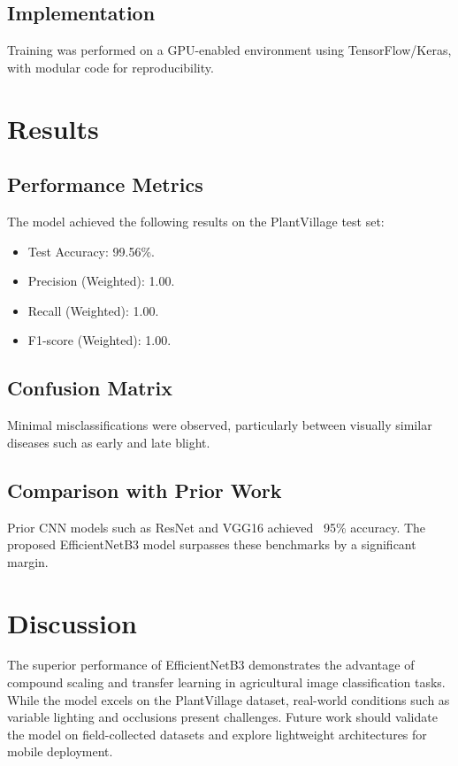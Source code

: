 \documentclass[12pt,a4paper]{report}
\begin{document}
\begin{List of Abbreviations}
\section{Implementation}
Training was performed on a GPU-enabled environment using TensorFlow/Keras, with modular code for reproducibility.

\chapter{Results}
\section{Performance Metrics}
The model achieved the following results on the PlantVillage test set:
\begin{itemize}
    \item Test Accuracy: 99.56\%.
    \item Precision (Weighted): 1.00.
    \item Recall (Weighted): 1.00.
    \item F1-score (Weighted): 1.00.
\end{itemize}

\section{Confusion Matrix}
Minimal misclassifications were observed, particularly between visually similar diseases such as early and late blight.

\section{Comparison with Prior Work}
Prior CNN models such as ResNet and VGG16 achieved ~95\% accuracy. The proposed EfficientNetB3 model surpasses these benchmarks by a significant margin.

\chapter{Discussion}
The superior performance of EfficientNetB3 demonstrates the advantage of compound scaling and transfer learning in agricultural image classification tasks. While the model excels on the PlantVillage dataset, real-world conditions such as variable lighting and occlusions present challenges. Future work should validate the model on field-collected datasets and explore lightweight architectures for mobile deployment.


\end{List of Abbreviations}
\end{document}
